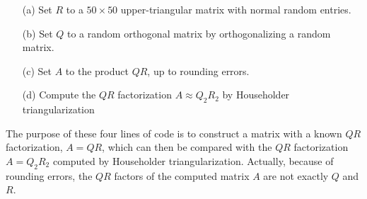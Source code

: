 \documentclass[10pt]{report}
\begin{document}
  \begin{enumerate}
    \item[(a)] Set $R$ to a $50\times50$ upper-triangular matrix with normal
    random entries.
    \item[(b)] Set $Q$ to a random orthogonal matrix by orthogonalizing a random
    matrix.
    \item[(c)] Set $A$ to the product $QR$, up to rounding errors.
    \item[(d)] Compute the $QR$ factorization $A\approx Q_2R_2$ by Householder
    triangularization 
  \end{enumerate}

  The purpose of these four lines of code is to construct a matrix with a known
  $QR$ factorization, $A=QR$, which can then be compared with the $QR$
  factorization $A=Q_2R_2$ computed by Householder triangularization. Actually,
  because of rounding errors, the $QR$ factors of the computed matrix $A$ are
  not exactly $Q$ and $R$.

\pagebreak
\end{document}
